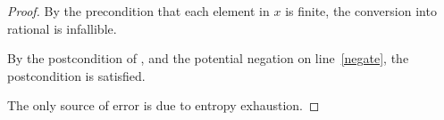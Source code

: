 \documentclass{article}
\begin{document}
\begin{proof}
    By the precondition that each element in $x$ is finite,
    the conversion into rational is infallible.
    
    By the postcondition of ,
    and the potential negation on line~\ref{negate},
    the postcondition is satisfied.

    The only source of error is due to entropy exhaustion.
\end{proof}
\end{document}
